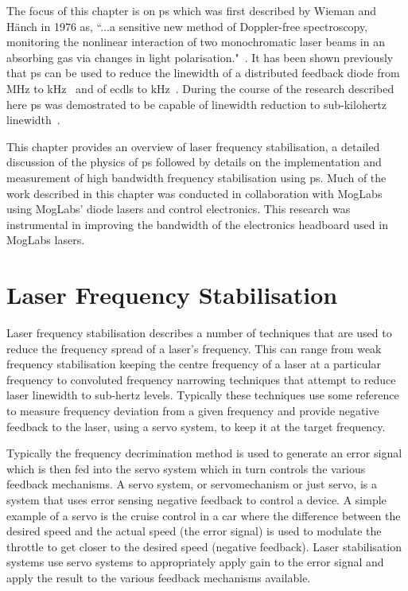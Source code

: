 The focus of this chapter is on \gls{ps} which was first described by Wieman and H\"anch in 1976 as, ``...a sensitive new method of Doppler-free spectroscopy, monitoring the nonlinear interaction of two monochromatic laser beams in an absorbing gas via changes in light polarisation."~\cite{wieman_doppler-free_1976,demtroder_laser_2003}.
It has been shown previously that \gls{ps} can be used to reduce the linewidth of a distributed feedback diode from \unit[2]{MHz} to \unit[20]{kHz}~\cite{torii_laser-phase_2012} and of \glspl{ecdl} to \unit[65]{kHz}~\cite{yoshikawa_frequency_2003}.
During the course of the research described here \gls{ps} was demostrated to be capable of linewidth reduction to sub-kilohertz linewidth~\cite{torrance_sub-kilohertz_2016}.

This chapter provides an overview of laser frequency stabilisation, a detailed discussion of the physics of \gls{ps} followed by details on the implementation and measurement of high bandwidth frequency stabilisation using \gls{ps}.
Much of the work described in this chapter was conducted in collaboration with MogLabs using MogLabs' diode lasers and control electronics.
This research was instrumental in improving the bandwidth of the electronics headboard used in MogLabs lasers.

\section{Laser Frequency Stabilisation}

Laser frequency stabilisation describes a number of techniques that are used to reduce the frequency spread of a laser's frequency.
This can range from weak frequency stabilisation keeping the centre frequency of a laser at a particular frequency to convoluted frequency narrowing techniques that attempt to reduce laser linewidth to sub-hertz levels.
Typically these techniques use some reference to measure frequency deviation from a given frequency and provide negative feedback to the laser, using a servo system, to keep it at the target frequency.

Typically the frequency decrimination method is used to generate an error signal which is then fed into the servo system which in turn controls the various feedback mechanisms.
A servo system, or servomechanism or just servo, is a system that uses error sensing negative feedback to control a device.
A simple example of a servo is the cruise control in a car where the difference between the desired speed and the actual speed (the error signal) is used to modulate the throttle to get closer to the desired speed (negative feedback).
Laser stabilisation systems use servo systems to appropriately apply gain to the error signal and apply the result to the various feedback mechanisms available.

